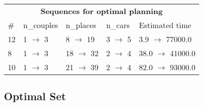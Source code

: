 \documentclass{article}
\begin{document}
                            \begin{center}
                            \begin{tabular}{l|l|l|l|l}
                            \multicolumn{5}{c}{\bf \large Sequences for optimal planning}\\
                            \# & n\_couples & n\_places & n\_cars & Estimated time\\\midrule
                            12&1 $\rightarrow$ 3&8 $\rightarrow$ 19&3 $\rightarrow$ 5&3.9 $\rightarrow$ 77000.0\\
8&1 $\rightarrow$ 3&18 $\rightarrow$ 32&2 $\rightarrow$ 4&38.0 $\rightarrow$ 41000.0\\
10&1 $\rightarrow$ 3&21 $\rightarrow$ 39&2 $\rightarrow$ 4&82.0 $\rightarrow$ 93000.0
                            \end{tabular}
                            \end{center}
                    
                                \subsection*{Optimal Set}
                                
\end{document}
